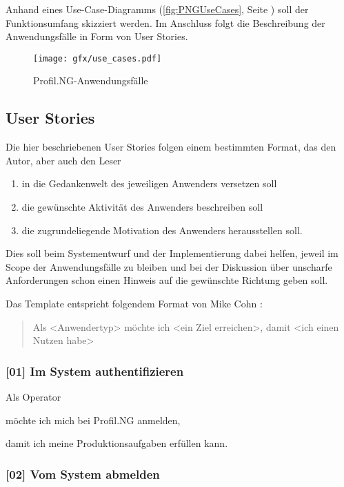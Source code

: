 Anhand eines Use-Case-Diagramms (\autoref{fig:PNGUseCases}, Seite
\pageref{fig:PNGUseCases}) soll der Funktionsumfang skizziert werden. Im
Anschluss folgt die Beschreibung der Anwendungsfälle in Form von User Stories.

\begin{figure}[h]
  \texttt{[image: gfx/use\_cases.pdf]}
  \caption{Profil.NG-Anwendungsfälle}
  \label{fig:PNGUseCases}
\end{figure}

\subsection{User Stories}

Die hier beschriebenen User Stories folgen einem bestimmten Format, das den
Autor, aber auch den Leser

\begin{enumerate}
  \item{in die Gedankenwelt des jeweiligen Anwenders versetzen soll}
  \item{die gewünschte Aktivität des Anwenders beschreiben soll}
  \item{die zugrundeliegende Motivation des Anwenders herausstellen soll.}
\end{enumerate}

Dies soll beim Systementwurf und der Implementierung dabei helfen, jeweil im
Scope der Anwendungsfälle zu bleiben und bei der Diskussion über unscharfe
Anforderungen schon einen Hinweis auf die gewünschte Richtung geben soll.

Das Template entspricht folgendem Format von Mike Cohn
\cite{user-stories-format}:

\begin{quotation}
  Als <Anwendertyp> möchte ich <ein Ziel erreichen>, damit <ich einen Nutzen habe>
\end{quotation}


\subsubsection{[01] Im System authentifizieren}

Als Operator

möchte ich mich bei Profil.NG anmelden,

damit ich meine Produktionsaufgaben erfüllen kann.

\subsubsection{[02] Vom System abmelden}


